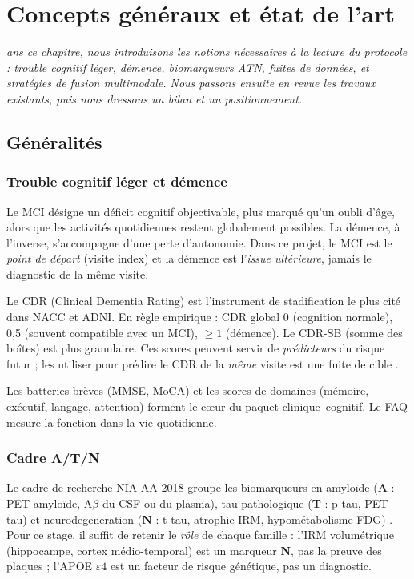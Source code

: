 \let\textcircled=\pgftextcircled
\chapter{Concepts généraux et état de l'art}
\label{chap:background}

\textit{ans ce chapitre, nous introduisons les notions nécessaires à la lecture du protocole : trouble cognitif léger, démence, biomarqueurs \ac{ATN}, fuites de données, et stratégies de fusion multimodale. Nous passons ensuite en revue les travaux existants, puis nous dressons un bilan et un positionnement.}

\newpage    

\section{Généralités}

\subsection{Trouble cognitif léger et démence}

Le \ac{MCI} désigne un déficit cognitif objectivable, plus marqué qu'un oubli d'âge, alors que les activités quotidiennes restent globalement possibles. La démence, à l'inverse, s'accompagne d'une perte d'autonomie. Dans ce projet, le \ac{MCI} est le \emph{point de départ} (visite index) et la démence est l'\emph{issue ultérieure}, jamais le diagnostic de la même visite.

Le \ac{CDR} (Clinical Dementia Rating) est l'instrument de stadification le plus cité dans NACC et ADNI. En règle empirique : CDR global 0 (cognition normale), 0,5 (souvent compatible avec un MCI), $\geq 1$ (démence). Le CDR-SB (somme des boîtes) est plus granulaire. Ces scores peuvent servir de \emph{prédicteurs} du risque futur ; les utiliser pour prédire le CDR de la \emph{même} visite est une fuite de cible \cite{plos2026leakage}.

Les batteries brèves (\ac{MMSE}, \ac{MoCA}) et les scores de domaines (mémoire, exécutif, langage, attention) forment le cœur du paquet clinique--cognitif. Le \ac{FAQ} mesure la fonction dans la vie quotidienne.

\subsection{Cadre A/T/N}

Le cadre de recherche NIA-AA 2018 groupe les biomarqueurs en amyloïde (\textbf{A} : \ac{PET} amyloïde, $\mathrm{A}\beta$ du \ac{CSF} ou du plasma), tau pathologique (\textbf{T} : p-tau, \ac{PET} tau) et neurodegeneration (\textbf{N} : t-tau, atrophie IRM, hypométabolisme FDG) \cite{jack2018atn}. Pour ce stage, il suffit de retenir le \emph{rôle} de chaque famille : l'IRM volumétrique (hippocampe, cortex médio-temporal) est un marqueur \textbf{N}, pas la preuve des plaques ; l'\ac{APOE} $\varepsilon 4$ est un facteur de risque génétique, pas un diagnostic.

